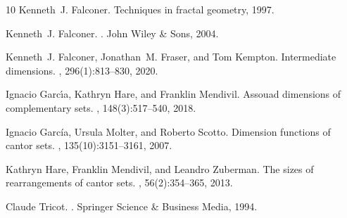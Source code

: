 \documentclass[11pt,reqno,bookmarksnumbered,raiselinks,breaklinks,colorlinks,plainpages]{amsart}
\begin{document}
\begin{thebibliography}{10}
Kenneth~J. Falconer.
\newblock Techniques in fractal geometry, 1997.

Kenneth~J. Falconer.
.
\newblock John Wiley \& Sons, 2004.

Kenneth~J. Falconer, Jonathan~M. Fraser, and Tom Kempton.
\newblock Intermediate dimensions.
, 296(1):813--830, 2020.

Ignacio Garc{\'\i}a, Kathryn Hare, and Franklin Mendivil.
\newblock Assouad dimensions of complementary sets.
, 148(3):517--540, 2018.

Ignacio Garc\'ia, Ursula Molter, and Roberto Scotto.
\newblock Dimension functions of cantor sets.
, 135(10):3151--3161, 2007.

Kathryn Hare, Franklin Mendivil, and Leandro Zuberman.
\newblock The sizes of rearrangements of cantor sets.
, 56(2):354--365, 2013.

Claude Tricot.
.
\newblock Springer Science \& Business Media, 1994.

\end{thebibliography}
\end{document}
